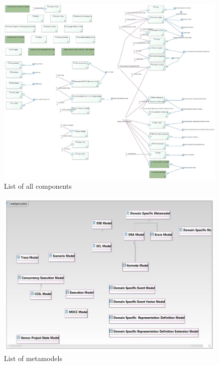 \documentclass{gemoc} %
\begin{document}
\begin{figure}[bt]
	\begin{center}
	\includegraphics*[trim=0.0cm 0.0cm 0cm 0.0cm, clip=true, width=1.0\linewidth]{../images/All Components list.jpg}
	\caption{List of all components}
	\label{fig:AllComponentList}
	\end{center}
\end{figure}
\begin{figure}[bt]
	\begin{center}
	\includegraphics*[trim=0.0cm 0.0cm 0cm 0.0cm, clip=true, width=1.0\linewidth]{../images/Gemoc Metamodels Class Diagram.jpg}
	\caption{List of metamodels}
	\label{fig:MetamodelList}
	\end{center}
\end{figure}
\end{document}
